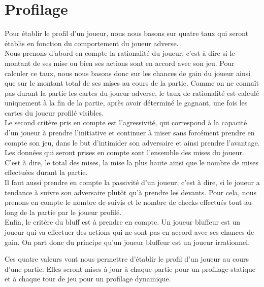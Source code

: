 \documentclass{report}
\begin{document}
\section{Profilage}
\hspace{0.5cm}Pour établir le profil d'un joueur, nous nous basons sur quatre taux qui seront établis en fonction du comportement du joueur adverse.\\

Nous prenons d'abord en compte la rationalité du joueur, c'est à dire si le montant de ses mise ou bien ses actions sont en accord avec son jeu. Pour calculer ce taux, nous nous basons donc sur les chances de gain du joueur ainsi que sur le montant total de ses mises au cours de la partie. Comme on ne connaît pas durant la partie les cartes du joueur adverse, le taux de rationalité est calculé uniquement à la fin de la partie, après avoir déterminé le gagnant, une fois les cartes du joueur profilé visibles.\\

Le second critère pris en compte est l'agressivité, qui correspond à la capacité d'un joueur à prendre l'initiative et continuer à miser sans forcément prendre en compte son jeu, dans le but d'intimider son adversaire et ainsi prendre l'avantage. Les données qui seront prises en compte sont l'ensemble des mises du joueur. C'est à dire, le total des mises, la mise la plus haute ainsi que le nombre de mises effectuées durant la partie. \\

Il faut aussi prendre en compte la passivité d'un joueur, c'est à dire, si le joueur a tendance à suivre son adversaire plutôt qu'à prendre les devants. Pour cela, nous prenons en compte le nombre de suivis et le nombre de checks effectués tout au long de la partie par le joueur profilé.\\

Enfin, le critère du bluff est à prendre en compte. Un joueur bluffeur est un joueur qui va effectuer des actions qui ne sont pas en accord avec ses chances de gain. On part donc du principe qu'un joueur bluffeur est un joueur irrationnel.\par

Ces quatre valeurs vont nous permettre d'établir le profil d'un joueur au cours d'une partie. Elles seront mises à jour à chaque partie pour un profilage statique et à chaque tour de jeu pour un profilage dynamique. \par
\end{document}
